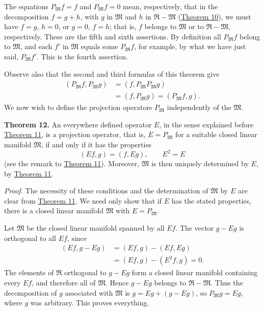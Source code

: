 \documentclass[fontsize=13pt,twoside,openany,headings=normal,parskip=false,bookmarkpackage=false,DIV=calc]{scrbook}
\begin{document}
\hypertarget{origpage-41}{}%
The equations $P_{\mathfrak{M}}f=f$ and $P_{\mathfrak{M}}f=0$ mean, respectively, that in the decomposition $f=g+h$, with $g$ in $\mathfrak{M}$ and $h$ in $\mathfrak{R}-\mathfrak{M}$ (\hyperref[thm:II.10]{Theorem 10}), we must have $f=g$, $h=0$, or $g=0$, $f=h$; that is, $f$ belongs to $\mathfrak{M}$ or to $\mathfrak{R}-\mathfrak{M}$, respectively. These are the fifth and sixth assertions. By definition all $P_{\mathfrak{M}}f$ belong to $\mathfrak{M}$, and each $f'$ in $\mathfrak{M}$ equals some $P_{\mathfrak{M}}f$, for example, by what we have just said, $P_{\mathfrak{M}}f'$. This is the fourth assertion.

Observe also that the second and third formulas of this theorem give
\begin{align*}
(P_{\mathfrak{M}}f,P_{\mathfrak{M}}g)&=(f,P_{\mathfrak{M}}P_{\mathfrak{M}}g)\\
&=(f,P_{\mathfrak{M}}g)=(P_{\mathfrak{M}}f,g).
\end{align*}
We now wish to define the projection operators $P_{\mathfrak{M}}$ independently of the $\mathfrak{M}$.

\leavevmode{}\textbf{Theorem 12.}\label{thm:II.12} An everywhere defined operator $E$, in the sense explained before \hyperref[thm:II.11]{Theorem 11}, is a projection operator, that is, $E=P_{\mathfrak{M}}$ for a suitable closed linear manifold $\mathfrak{M}$, if and only if it has the properties
\[
(Ef,g)=(f,Eg),\qquad E^2=E
\]
(see the remark to \hyperref[thm:II.11]{Theorem 11}). Moreover, $\mathfrak{M}$ is then uniquely determined by $E$, by \hyperref[thm:II.11]{Theorem 11}.

\emph{Proof.} The necessity of these conditions and the determination of $\mathfrak{M}$ by $E$ are clear from \hyperref[thm:II.11]{Theorem 11}. We need only show that if $E$ has the stated properties, there is a closed linear manifold $\mathfrak{M}$ with $E=P_{\mathfrak{M}}$.

Let $\mathfrak{M}$ be the closed linear manifold spanned by all $Ef$. The vector $g-Eg$ is orthogonal to all $Ef$, since
\begin{align*}
(Ef,g-Eg)&=(Ef,g)-(Ef,Eg)\\
&=(Ef,g)-(E^2f,g)=0.
\end{align*}
The elements of $\mathfrak{R}$ orthogonal to $g-Eg$ form a closed linear manifold containing every $Ef$, and therefore all of $\mathfrak{M}$. Hence $g-Eg$ belongs to $\mathfrak{R}-\mathfrak{M}$. Thus the decomposition of $g$ associated with $\mathfrak{M}$ is $g=Eg+(g-Eg)$, so $P_{\mathfrak{M}}g=Eg$, where $g$ was arbitrary. This proves everything.
\end{document}

